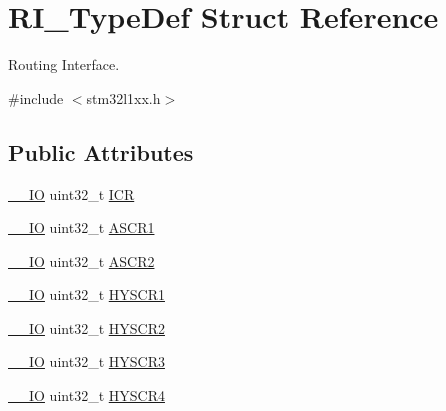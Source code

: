 \hypertarget{struct_r_i___type_def}{\section{R\-I\-\_\-\-Type\-Def Struct Reference}
\label{struct_r_i___type_def}
}


Routing Interface.  




{\ttfamily \#include $<$stm32l1xx.\-h$>$}

\subsection*{Public Attributes}
\begin{DoxyCompactItemize}
\item 
\hyperlink{group___c_m_s_i_s__core__definitions_gaec43007d9998a0a0e01faede4133d6be}{\-\_\-\-\_\-\-I\-O} uint32\-\_\-t \hyperlink{struct_r_i___type_def_adb5a93377d850e81160dc037c5995029}{I\-C\-R}
\item 
\hyperlink{group___c_m_s_i_s__core__definitions_gaec43007d9998a0a0e01faede4133d6be}{\-\_\-\-\_\-\-I\-O} uint32\-\_\-t \hyperlink{struct_r_i___type_def_a0e22b5b4cb660a876e185c9c2225f45f}{A\-S\-C\-R1}
\item 
\hyperlink{group___c_m_s_i_s__core__definitions_gaec43007d9998a0a0e01faede4133d6be}{\-\_\-\-\_\-\-I\-O} uint32\-\_\-t \hyperlink{struct_r_i___type_def_aeef72e9f5e1d864dde15d636219ac58d}{A\-S\-C\-R2}
\item 
\hyperlink{group___c_m_s_i_s__core__definitions_gaec43007d9998a0a0e01faede4133d6be}{\-\_\-\-\_\-\-I\-O} uint32\-\_\-t \hyperlink{struct_r_i___type_def_a807f9b63b7cb1357354fb8f7e07bfbb0}{H\-Y\-S\-C\-R1}
\item 
\hyperlink{group___c_m_s_i_s__core__definitions_gaec43007d9998a0a0e01faede4133d6be}{\-\_\-\-\_\-\-I\-O} uint32\-\_\-t \hyperlink{struct_r_i___type_def_a2b8a23d4df42b1d0ca4d902e1f13a61d}{H\-Y\-S\-C\-R2}
\item 
\hyperlink{group___c_m_s_i_s__core__definitions_gaec43007d9998a0a0e01faede4133d6be}{\-\_\-\-\_\-\-I\-O} uint32\-\_\-t \hyperlink{struct_r_i___type_def_a0dd74384be92e97899cb4d7477962d50}{H\-Y\-S\-C\-R3}
\item 
\hyperlink{group___c_m_s_i_s__core__definitions_gaec43007d9998a0a0e01faede4133d6be}{\-\_\-\-\_\-\-I\-O} uint32\-\_\-t \hyperlink{struct_r_i___type_def_ad54de1fa4e48c8bd79e0afcfeb2bac27}{H\-Y\-S\-C\-R4}
\end{DoxyCompactItemize}


